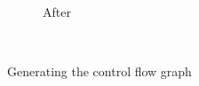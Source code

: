 \begin{figure}[htb]
{\begin{subfigure}[b]{.6\textwidth}
        \caption{After}
    \end{subfigure}%
    }\\
    \caption{Generating the control flow graph \label{img:blocks}}
\end{figure}
